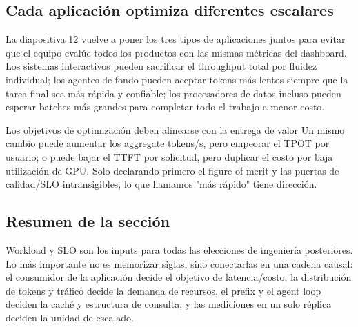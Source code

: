 
\subsection{Cada aplicación optimiza diferentes escalares}

La diapositiva 12 vuelve a poner los tres tipos de aplicaciones juntos para evitar que el equipo evalúe todos los productos con las mismas métricas del dashboard. Los sistemas interactivos pueden sacrificar el throughput total por fluidez individual; los agentes de fondo pueden aceptar tokens más lentos siempre que la tarea final sea más rápida y confiable; los procesadores de datos incluso pueden esperar batches más grandes para completar todo el trabajo a menor costo.


\begin{importantbox}{Los objetivos de optimización deben alinearse con la entrega de valor}
Un mismo cambio puede aumentar los aggregate tokens/s, pero empeorar el TPOT por usuario; o puede bajar el TTFT por solicitud, pero duplicar el costo por baja utilización de GPU. Solo declarando primero el figure of merit y las puertas de calidad/SLO intransigibles, lo que llamamos "más rápido" tiene dirección.
\end{importantbox}

\subsection{Resumen de la sección}

Workload y SLO son los inputs para todas las elecciones de ingeniería posteriores. Lo más importante no es memorizar siglas, sino conectarlas en una cadena causal: el consumidor de la aplicación decide el objetivo de latencia/costo, la distribución de tokens y tráfico decide la demanda de recursos, el prefix y el agent loop deciden la caché y estructura de consulta, y las mediciones en un solo réplica deciden la unidad de escalado.


